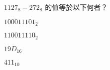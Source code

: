 \ifx\ntpcNinetyTwo\undefined[92學年基北區] \fi
${1127}_{8}-{272}_{8}$ 的值等於以下何者？
  \begin{optionlist}
  \item ${100011101}_{2}$
  \item ${110011110}_{2}$
  \item ${19D}_{16}$\label{ntpc-92-a47}
  \item ${411}_{10}$
  \end{optionlist}